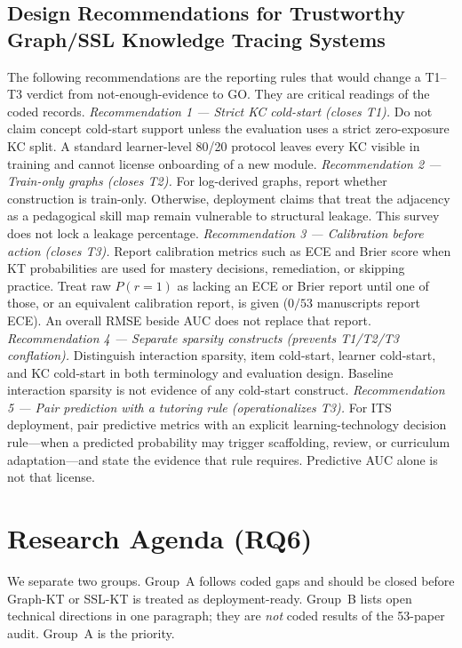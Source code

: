 \documentclass[lettersize,journal]{IEEEtran}
\begin{document}
\subsection{Design Recommendations for Trustworthy Graph/SSL Knowledge Tracing Systems}
\label{sec:design_recs}
The following recommendations are the reporting rules that would change a T1--T3 verdict from not-enough-evidence to GO. They are critical readings of the coded records.
\textit{Recommendation 1 --- Strict KC cold-start (closes T1).} Do not claim concept cold-start support unless the evaluation uses a strict zero-exposure KC split. A standard learner-level 80/20 protocol leaves every KC visible in training and cannot license onboarding of a new module.
\textit{Recommendation 2 --- Train-only graphs (closes T2).} For log-derived graphs, report whether construction is train-only. Otherwise, deployment claims that treat the adjacency as a pedagogical skill map remain vulnerable to structural leakage. This survey does not lock a leakage percentage.
\textit{Recommendation 3 --- Calibration before action (closes T3).} Report calibration metrics such as ECE and Brier score when KT probabilities are used for mastery decisions, remediation, or skipping practice. Treat raw $P(r=1)$ as lacking an ECE or Brier report until one of those, or an equivalent calibration report, is given ($0/53$ manuscripts report ECE). An overall RMSE beside AUC does not replace that report.
\textit{Recommendation 4 --- Separate sparsity constructs (prevents T1/T2/T3 conflation).} Distinguish interaction sparsity, item cold-start, learner cold-start, and KC cold-start in both terminology and evaluation design. Baseline interaction sparsity is not evidence of any cold-start construct.
\textit{Recommendation 5 --- Pair prediction with a tutoring rule (operationalizes T3).} For ITS deployment, pair predictive metrics with an explicit learning-technology decision rule---when a predicted probability may trigger scaffolding, review, or curriculum adaptation---and state the evidence that rule requires. Predictive AUC alone is not that license.

\section{Research Agenda (RQ6)}
\label{sec:agenda}
We separate two groups. Group~A follows coded gaps and should be closed before Graph-KT or SSL-KT is treated as deployment-ready. Group~B lists open technical directions in one paragraph; they are \emph{not} coded results of the 53-paper audit. Group~A is the priority.
\end{document}
